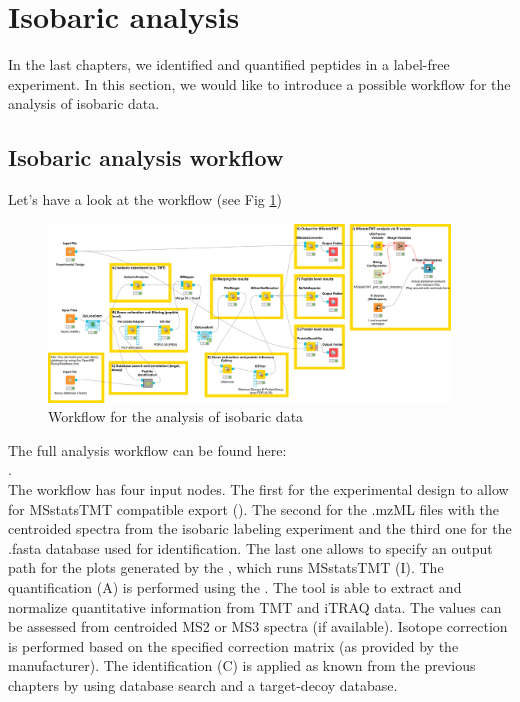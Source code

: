 

\newpage
\section{Isobaric analysis}
In the last chapters, we identified and quantified peptides in a label-free experiment. In this section, we would like to introduce a possible workflow for the analysis of isobaric data.

\subsection{Isobaric analysis workflow}
Let's have a look at the workflow (see Fig \ref{fig:isobaric_wf})

\begin{figure}[htbp]
  \centering
  \includegraphics[width=0.95\textwidth]{graphics/isobaric/isobaric_inference_wf.png}
  \caption{Workflow for the analysis of isobaric data}
  \label{fig:isobaric_wf}
\end{figure}

\noindent The full analysis workflow can be found here: \\
. \\

\noindent The workflow has four input nodes. The first for the experimental design to allow for MSstatsTMT compatible export (). The second for the .mzML files with the centroided spectra from the isobaric labeling experiment and the third one for the .fasta database used for identification. The last one allows to specify an output path for the plots generated by the , which runs MSstatsTMT (I). The quantification (A) is performed using the . The tool is able to extract and normalize quantitative information from TMT and iTRAQ data. The values can be assessed from centroided MS2 or MS3 spectra (if available). Isotope correction is performed based on the specified correction matrix (as provided by the manufacturer). The identification (C) is applied as known from the previous chapters by using database search and a target-decoy database.

